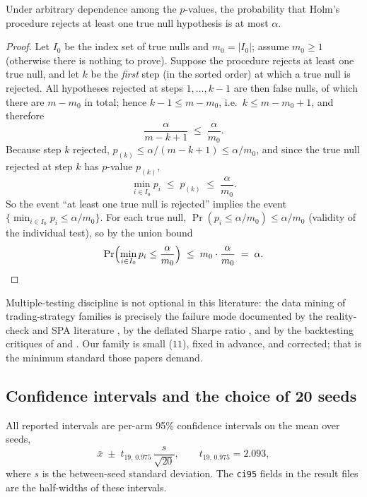 \begin{proposition}
\label{prop:dd5-holm-fwer}
Under arbitrary dependence among the $p$-values, the probability that Holm's
procedure rejects at least one true null hypothesis is at most $\alpha$.
\end{proposition}

\begin{proof}
Let $I_0$ be the index set of true nulls and $m_0 = |I_0|$; assume $m_0 \ge 1$
(otherwise there is nothing to prove). Suppose the procedure rejects at least
one true null, and let $k$ be the \emph{first} step (in the sorted order) at
which a true null is rejected. All hypotheses rejected at steps
$1,\dots,k-1$ are then false nulls, of which there are $m - m_0$ in total;
hence $k - 1 \le m - m_0$, i.e.\ $k \le m - m_0 + 1$, and therefore
\[
\frac{\alpha}{m - k + 1} \;\le\; \frac{\alpha}{m_0}.
\]
Because step $k$ rejected, $p_{(k)} \le \alpha/(m-k+1) \le \alpha/m_0$, and
since the true null rejected at step $k$ has $p$-value $p_{(k)}$,
\[
\min_{i \in I_0} p_i \;\le\; p_{(k)} \;\le\; \frac{\alpha}{m_0}.
\]
So the event ``at least one true null is rejected'' implies the event
$\{\min_{i \in I_0} p_i \le \alpha/m_0\}$. For each true null,
$\Pr(p_i \le \alpha/m_0) \le \alpha/m_0$ (validity of the individual test),
so by the union bound
\[
\Pr\Bigl(\min_{i \in I_0} p_i \le \frac{\alpha}{m_0}\Bigr)
\;\le\; m_0 \cdot \frac{\alpha}{m_0} \;=\; \alpha. \qedhere
\]
\end{proof}

Multiple-testing discipline is not optional in this literature: the data
mining of trading-strategy families is precisely the failure mode documented
by the reality-check and SPA literature
\citep{white2000reality,hansen2005spa}, by the deflated Sharpe ratio
\citep{bailey2014deflated}, and by the backtesting critiques of
\citet{harvey2016backtesting} and \citet{lopez2018advances}. Our family is
small ($11$), fixed in advance, and corrected; that is the minimum standard
those papers demand.

\subsection{Confidence intervals and the choice of 20 seeds}
\label{sec:dd5-ci}

All reported intervals are per-arm 95\% confidence intervals on the mean over
seeds,
\begin{equation}
\bar{x} \;\pm\; t_{19,\,0.975}\, \frac{s}{\sqrt{20}}, \qquad
t_{19,\,0.975} = 2.093,
\label{eq:dd5-ci}
\end{equation}
where $s$ is the between-seed standard deviation. The \texttt{ci95} fields in
the result files are the half-widths of these intervals.

